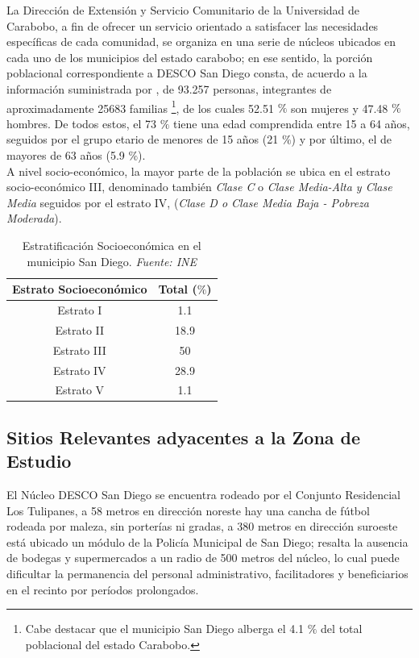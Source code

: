 \documentclass[11pt, a4paper, twosides]{report}
\begin{document}
La Dirección de Extensión y Servicio Comunitario de la Universidad de Carabobo, a fin de ofrecer un servicio orientado a satisfacer las necesidades específicas de cada comunidad, se organiza en una serie de núcleos ubicados en cada uno de los municipios del estado carabobo; en ese sentido, la porción poblacional correspondiente a DESCO San Diego consta, de acuerdo a la información suministrada por \cite{censo}, de 93.257 personas, integrantes de aproximadamente 25683 familias \footnote{Cabe destacar que el municipio San Diego alberga el 4.1 $\%$ del total poblacional del estado Carabobo.}, de los cuales 52.51 $\%$ son mujeres y 47.48 $\%$ hombres. De todos estos, el 73 $\%$ tiene una edad comprendida entre 15 a 64 años, seguidos por el grupo etario de menores de 15 años (21 $\%$) y por último, el de mayores de 63 años (5.9 $\%$).\\
A nivel socio-económico, la mayor parte de la población se ubica en el estrato socio-económico III, denominado también \textit{Clase C} o \textit{Clase Media-Alta y Clase Media} seguidos por el estrato IV, (\textit{Clase D o \textit{Clase Media Baja - Pobreza Moderada}}).

\begin{table}[h]
	\centering
	\begin{tabular}{|c|c|}
		\hline
		\cellcolor{gray75} \textbf{Estrato Socioeconómico} & \cellcolor{gray75} \textbf{Total ($\%$)} \\ \hline
		Estrato I & 1.1 \\ \hline
		Estrato II  & 18.9 \\ \hline
		Estrato III & 50 \\ \hline
		Estrato IV & 28.9 \\ \hline
		Estrato V & 1.1 \\ \hline
	\end{tabular}
	\caption{Estratificación Socioeconómica en el municipio San Diego. \textit{Fuente: INE}}
	\label{tabla1}
\end{table}

\subsection{Sitios Relevantes adyacentes a la Zona de Estudio}
El Núcleo DESCO San Diego se encuentra rodeado por el Conjunto Residencial Los Tulipanes, a 58 metros en dirección noreste hay una cancha de fútbol rodeada por maleza, sin porterías ni gradas, a 380 metros en dirección suroeste está ubicado un módulo de la Policía Municipal de San Diego; resalta la ausencia de bodegas y supermercados a un radio de 500 metros del núcleo, lo cual puede dificultar la permanencia del personal administrativo, facilitadores y beneficiarios en el recinto por períodos prolongados.
\end{document}
